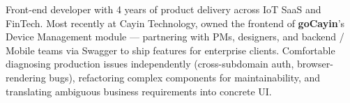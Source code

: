 
\begin{cvparagraph}
Front-end developer with 4 years of product delivery across IoT SaaS and FinTech. Most recently at Cayin Technology, owned the frontend of \textbf{goCayin}'s Device Management module — partnering with PMs, designers, and backend / Mobile teams via Swagger to ship features for enterprise clients. Comfortable diagnosing production issues independently (cross-subdomain auth, browser-rendering bugs), refactoring complex components for maintainability, and translating ambiguous business requirements into concrete UI.
\end{cvparagraph}
